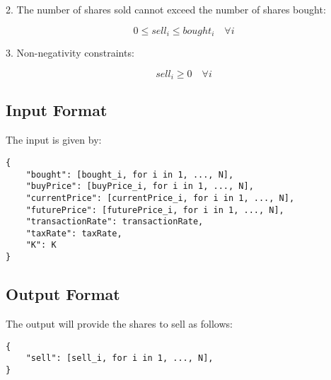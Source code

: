 \documentclass{article}
\begin{document}
2. The number of shares sold cannot exceed the number of shares bought:

\[
0 \leq sell_i \leq bought_i \quad \forall i
\]

3. Non-negativity constraints:

\[
sell_i \geq 0 \quad \forall i
\]

\subsection*{Input Format}
The input is given by:
\begin{verbatim}
{
    "bought": [bought_i, for i in 1, ..., N],
    "buyPrice": [buyPrice_i, for i in 1, ..., N],
    "currentPrice": [currentPrice_i, for i in 1, ..., N],
    "futurePrice": [futurePrice_i, for i in 1, ..., N],
    "transactionRate": transactionRate,
    "taxRate": taxRate,
    "K": K
}
\end{verbatim}

\subsection*{Output Format}
The output will provide the shares to sell as follows:
\begin{verbatim}
{
    "sell": [sell_i, for i in 1, ..., N],
}
\end{verbatim}
\end{document}
